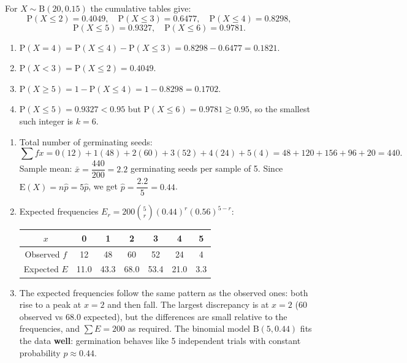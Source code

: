 \documentclass[11pt]{article}
\begin{document}
\begin{corrige}
For $X \sim \mathrm{B}(20, 0.15)$ the cumulative tables give:
\[ \mathrm{P}(X \le 2) = 0.4049, \quad \mathrm{P}(X \le 3) = 0.6477, \quad \mathrm{P}(X \le 4) = 0.8298, \]
\[ \mathrm{P}(X \le 5) = 0.9327, \quad \mathrm{P}(X \le 6) = 0.9781. \]
\begin{enumerate}
\item $\mathrm{P}(X = 4) = \mathrm{P}(X \le 4) - \mathrm{P}(X \le 3) = 0.8298 - 0.6477 = 0.1821.$
\item $\mathrm{P}(X < 3) = \mathrm{P}(X \le 2) = 0.4049.$
\item $\mathrm{P}(X \ge 5) = 1 - \mathrm{P}(X \le 4) = 1 - 0.8298 = 0.1702.$
\item $\mathrm{P}(X \le 5) = 0.9327 < 0.95$ but $\mathrm{P}(X \le 6) = 0.9781 \ge 0.95$, so the smallest such integer is $k = 6$.
\end{enumerate}
\end{corrige}

\begin{corrige}
\begin{enumerate}
\item Total number of germinating seeds:
\[ \sum fx = 0(12) + 1(48) + 2(60) + 3(52) + 4(24) + 5(4) = 48 + 120 + 156 + 96 + 20 = 440. \]
Sample mean: $\bar{x} = \dfrac{440}{200} = 2.2$ germinating seeds per sample of 5.
Since $\mathrm{E}(X) = n\hat{p} = 5\hat{p}$, we get $\hat{p} = \dfrac{2.2}{5} = 0.44$.
\item Expected frequencies $E_r = 200\binom{5}{r}(0.44)^r(0.56)^{5-r}$:
\begin{center}
\begin{tabular}{|c|cccccc|}
\hline
\rowcolor{popblueL} $x$ & 0 & 1 & 2 & 3 & 4 & 5 \\
\hline
Observed $f$ & 12 & 48 & 60 & 52 & 24 & 4 \\
\hline
Expected $E$ & 11.0 & 43.3 & 68.0 & 53.4 & 21.0 & 3.3 \\
\hline
\end{tabular}
\end{center}
\item The expected frequencies follow the same pattern as the observed ones: both rise to a peak at $x = 2$ and then fall. The largest discrepancy is at $x = 2$ (60 observed vs 68.0 expected), but the differences are small relative to the frequencies, and $\sum E = 200$ as required. The binomial model $\mathrm{B}(5, 0.44)$ fits the data \textbf{well}: germination behaves like 5 independent trials with constant probability $p \approx 0.44$.
\end{enumerate}
\end{corrige}
\end{document}
